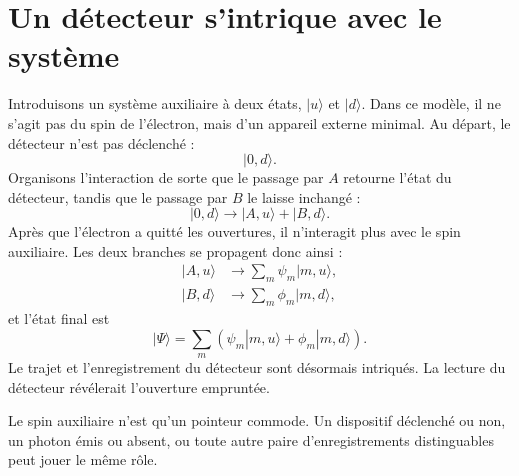 \section{Un détecteur s’intrique avec le système}

Introduisons un système auxiliaire à deux états, \(|u\rangle\) et \(|d\rangle\). Dans ce modèle, il ne s’agit pas du spin de l’électron, mais d’un appareil externe minimal. Au départ, le détecteur n’est pas déclenché :
\begin{equation}
|0,d\rangle.
\end{equation}
Organisons l’interaction de sorte que le passage par \(A\) retourne l’état du détecteur, tandis que le passage par \(B\) le laisse inchangé :
\begin{equation}
|0,d\rangle
\longrightarrow
|A,u\rangle+|B,d\rangle.
\end{equation}
Après que l’électron a quitté les ouvertures, il n’interagit plus avec le spin auxiliaire. Les deux branches se propagent donc ainsi :
\begin{align}
|A,u\rangle &\longrightarrow \sum_m\psi_m|m,u\rangle, \\
|B,d\rangle &\longrightarrow \sum_m\phi_m|m,d\rangle,
\end{align}
et l’état final est
\begin{equation}
|\Psi\rangle
=\sum_m\left(\psi_m|m,u\rangle+\phi_m|m,d\rangle\right).
\end{equation}
Le trajet et l’enregistrement du détecteur sont désormais intriqués. La lecture du détecteur révélerait l’ouverture empruntée.

\begin{classroomqa}
\end{classroomqa}

Le spin auxiliaire n’est qu’un pointeur commode. Un dispositif déclenché ou non, un photon émis ou absent, ou toute autre paire d’enregistrements distinguables peut jouer le même rôle.

